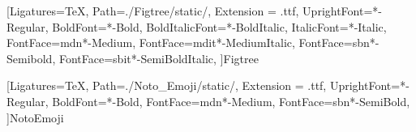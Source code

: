 

\makeatother
\renewcommand{\ttdefault}{qcr}



    

\newfontfamily{\FigtreeFont}[Ligatures=TeX,
        Path=./Figtree/static/,
        Extension = .ttf,
        UprightFont=*-Regular,
        BoldFont=*-Bold,
        BoldItalicFont=*-BoldItalic,
        ItalicFont=*-Italic,
        FontFace={md}{n}{*-Medium},
        FontFace={md}{it}{*-MediumItalic},
        FontFace={sb}{n}{*-Semibold},
        FontFace={sb}{it}{*-SemiBoldItalic},
        ]{Figtree}


\newfontfamily{} %

\newfontfamily{\NotoEmojiFont}[Ligatures=TeX,
    Path=./Noto_Emoji/static/,
    Extension = .ttf,
    UprightFont=*-Regular,
    BoldFont=*-Bold,
    FontFace={md}{n}{*-Medium},
    FontFace={sb}{n}{*-SemiBold},
    ]{NotoEmoji}


